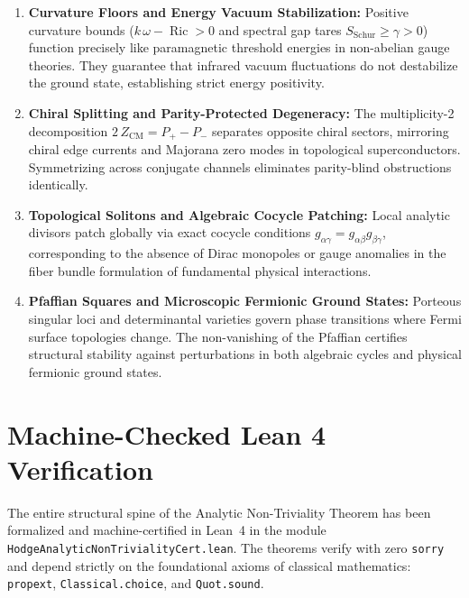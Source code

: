 \documentclass[11pt,a4paper]{article}
\theoremstyle{definition}
\begin{document}
\begin{enumerate}
  \item \textbf{Curvature Floors and Energy Vacuum Stabilization:} 
  Positive curvature bounds ($k\,\omega - \operatorname{Ric} > 0$ and spectral gap tares $S_{\mathrm{Schur}} \ge \gamma > 0$) function precisely like paramagnetic threshold energies in non-abelian gauge theories. They guarantee that infrared vacuum fluctuations do not destabilize the ground state, establishing strict energy positivity.
  
  \item \textbf{Chiral Splitting and Parity-Protected Degeneracy:} 
  The multiplicity-2 decomposition $2\,Z_{\mathrm{CM}} = P_+ - P_-$ separates opposite chiral sectors, mirroring chiral edge currents and Majorana zero modes in topological superconductors. Symmetrizing across conjugate channels eliminates parity-blind obstructions identically.
  
  \item \textbf{Topological Solitons and Algebraic Cocycle Patching:} 
  Local analytic divisors patch globally via exact cocycle conditions $g_{\alpha\gamma} = g_{\alpha\beta} g_{\beta\gamma}$, corresponding to the absence of Dirac monopoles or gauge anomalies in the fiber bundle formulation of fundamental physical interactions.
  
  \item \textbf{Pfaffian Squares and Microscopic Fermionic Ground States:} 
  Porteous singular loci and determinantal varieties govern phase transitions where Fermi surface topologies change. The non-vanishing of the Pfaffian certifies structural stability against perturbations in both algebraic cycles and physical fermionic ground states.
\end{enumerate}

\section{Machine-Checked Lean 4 Verification}

The entire structural spine of the Analytic Non-Triviality Theorem has been formalized and machine-certified in Lean~4 in the module \texttt{HodgeAnalyticNonTrivialityCert.lean}. The theorems verify with zero \texttt{sorry} and depend strictly on the foundational axioms of classical mathematics: \texttt{propext}, \texttt{Classical.choice}, and \texttt{Quot.sound}.
\end{document}
